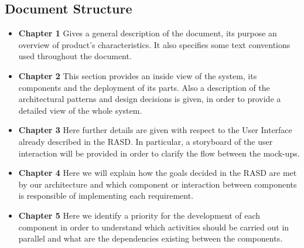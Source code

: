 \subsection{Document Structure}
\begin{itemize}
	\item \textbf{Chapter 1} 
	Gives a general description of the document, its purpose an overview of product's characteristics. It also specifies some text conventions used throughout the document.
	
	\item \textbf{Chapter 2}
	This section provides an inside view of the system, its components and the deployment of its parts.
	Also a description of the architectural patterns and design decisions is given, in order to provide a detailed view of the whole system.
	
	\item \textbf{Chapter 3}
	Here further details are given with respect to the User Interface already described in the RASD.
	In particular, a storyboard of the user interaction will be provided in order to clarify the flow between the mock-ups.
	
	\item \textbf{Chapter 4}
	Here we will explain how the goals decided in the RASD are met by our architecture and which component or interaction between components is responsible of implementing each requirement. 
	
	\item \textbf{Chapter 5}
	Here we identify a priority for the development of each component in order to understand which activities should be carried out in parallel and what are the dependencies existing between the components.

\end{itemize}
